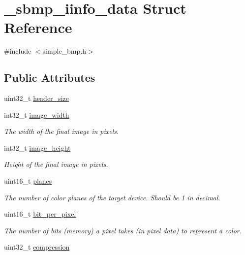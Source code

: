 \hypertarget{struct__sbmp__iinfo__data}{}\section{\+\_\+sbmp\+\_\+iinfo\+\_\+data Struct Reference}
\label{struct__sbmp__iinfo__data}


{\ttfamily \#include $<$simple\+\_\+bmp.\+h$>$}

\subsection*{Public Attributes}
\begin{DoxyCompactItemize}
\item 
uint32\+\_\+t \hyperlink{struct__sbmp__iinfo__data_afc4715e7497adc746ddbd34784684b29}{header\+\_\+size}
\item 
int32\+\_\+t \hyperlink{struct__sbmp__iinfo__data_a7a675198311e8f0b633339855f755055}{image\+\_\+width}
\begin{DoxyCompactList}\small\item\em The width of the final image in pixels. \end{DoxyCompactList}\item 
int32\+\_\+t \hyperlink{struct__sbmp__iinfo__data_a51fde7d7a00eb71a2f99d80387ca3f7d}{image\+\_\+height}
\begin{DoxyCompactList}\small\item\em Height of the final image in pixels. \end{DoxyCompactList}\item 
uint16\+\_\+t \hyperlink{struct__sbmp__iinfo__data_a27b2bede3f33e37d3efd7dd0da350ac0}{planes}
\begin{DoxyCompactList}\small\item\em The number of color planes of the target device. Should be \textquotesingle{}1\textquotesingle{} in decimal. \end{DoxyCompactList}\item 
uint16\+\_\+t \hyperlink{struct__sbmp__iinfo__data_a2cc104e8b5f4309450247ca139d34dd5}{bit\+\_\+per\+\_\+pixel}
\begin{DoxyCompactList}\small\item\em The number of bits (memory) a pixel takes (in pixel data) to represent a color. \end{DoxyCompactList}\item 
uint32\+\_\+t \hyperlink{struct__sbmp__iinfo__data_adcf2f65ac17f1e8bc6f7b3ed404e3883}{compression}

\end{DoxyCompactItemize}
